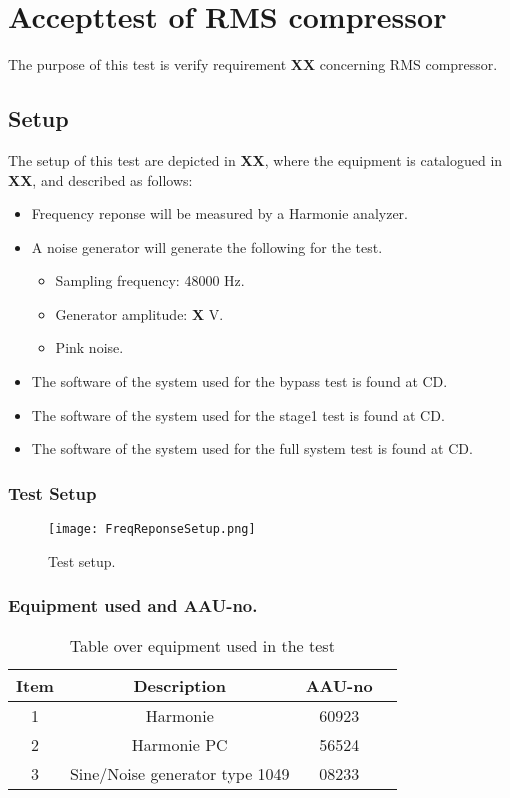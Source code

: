 \chapter{Accepttest of RMS compressor}\label{app:journal_Frequency_Response}
The purpose of this test is verify requirement \textbf{XX} concerning RMS compressor.

\section{Setup}
The setup of this test are depicted in \textbf{XX}, where the equipment is catalogued in \textbf{XX}, and described as follows:

\begin{itemize}
\item Frequency reponse will be measured by a Harmonie analyzer.
\item A noise generator will generate the following for the test. 
\begin{itemize}
\item Sampling frequency: 48000 Hz.
\item Generator amplitude: \textbf{X} V.
\item Pink noise.
\end{itemize}
\item The software of the system used for the bypass test is found at CD. 
\item The software of the system used for the stage1 test is found at CD. 
\item The software of the system used for the full system test is found at CD. 
\end{itemize}


\subsection*{Test Setup}
\begin{figure}[H]
\centering
\texttt{[image: FreqReponseSetup.png]}
\label{fig:AcceptFreqResponse}
\caption{Test setup.}
\end{figure}

\subsection*{Equipment used and AAU-no.}

\begin{table}[H]
\centering
{}
\begin{tabular}{S[table-format=1]ccc} \toprule
    {Item} & {Description} & {AAU-no} \\       &  Harmonie  & 60923  \\ 
    2      &  Harmonie PC  & 56524  \\ 
    3      &  Sine/Noise generator type 1049  & 08233  \\  \bottomrule 
\end{tabular}
\caption{Table over equipment used in the test}
\label{tab:UsedEquipmentFreqResponse}
\end{table}
\vspace{-5mm}


